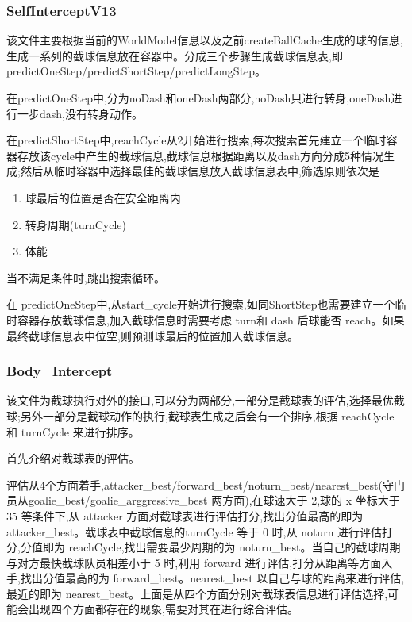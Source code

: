 \subsubsection{SelfInterceptV13}
该文件主要根据当前的WorldModel信息以及之前createBallCache生成的球的信息,生成一系列的截球信息放在容器中。分成三个步骤生成截球信息表,即 predictOneStep/predictShortStep/predictLongStep。

在predictOneStep中,分为noDash和oneDash两部分,noDash只进行转身,oneDash进行一步dash,没有转身动作。

在predictShortStep中,reachCycle从2开始进行搜索,每次搜索首先建立一个临时容器存放该cycle中产生的截球信息,截球信息根据距离以及dash方向分成5种情况生成;然后从临时容器中选择最佳的截球信息放入截球信息表中,筛选原则依次是

\begin{enumerate}
	\item 球最后的位置是否在安全距离内	
	\item 转身周期(turnCycle)
	\item 体能
\end{enumerate}


当不满足条件时,跳出搜索循环。

在 predictOneStep中,从start_cycle开始进行搜索,如同ShortStep也需要建立一个临时容器存放截球信息,加入截球信息时需要考虑 turn和 dash 后球能否 reach。如果最终截球信息表中位空,则预测球最后的位置加入截球信息。


\subsubsection{Body_Intercept}
该文件为截球执行对外的接口,可以分为两部分,一部分是截球表的评估,选择最优截球;另外一部分是截球动作的执行,截球表生成之后会有一个排序,根据 reachCycle 和 turnCycle 来进行排序。

首先介绍对截球表的评估。

评估从4个方面着手,attacker_best/forward_best/noturn_best/nearest_best(守门员从goalie_best/goalie_arggressive_best 两方面),在球速大于 2,球的 x 坐标大于 35 等条件下,从 attacker 方面对截球表进行评估打分,找出分值最高的即为 attacker_best。截球表中截球信息的turnCycle 等于 0 时,从 noturn 进行评估打分,分值即为 reachCycle,找出需要最少周期的为 noturn_best。当自己的截球周期与对方最快截球队员相差小于 5 时,利用 forward 进行评估,打分从距离等方面入手,找出分值最高的为 forward_best。nearest_best 以自己与球的距离来进行评估,最近的即为 nearest_best。上面是从四个方面分别对截球表信息进行评估选择,可能会出现四个方面都存在的现象,需要对其在进行综合评估。


